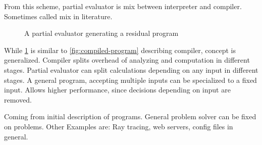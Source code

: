 From this scheme, partial evaluator is mix between interpreter and compiler.
Sometimes called mix in literature.

\begin{figure}
  \centering
  
  \caption{A partial evaluator generating a residual program}\label{fig:partial-evaluated-program}
\end{figure}

While \ref{fig:partial-evaluated-program} is similar to \ref{fig:compiled-program} describing compiler, concept is generalized.
Compiler splits overhead of analyzing and computation in different stages.
Partial evaluator can split calculations depending on any input in different stages.
A general program, accepting multiple inputs can be specialized to a fixed input.
Allows higher performance, since decisions depending on input are removed.

Coming from initial description of programs.
General problem solver can be fixed on problems.
Other Examples are: Ray tracing, web servers, config files in general.



